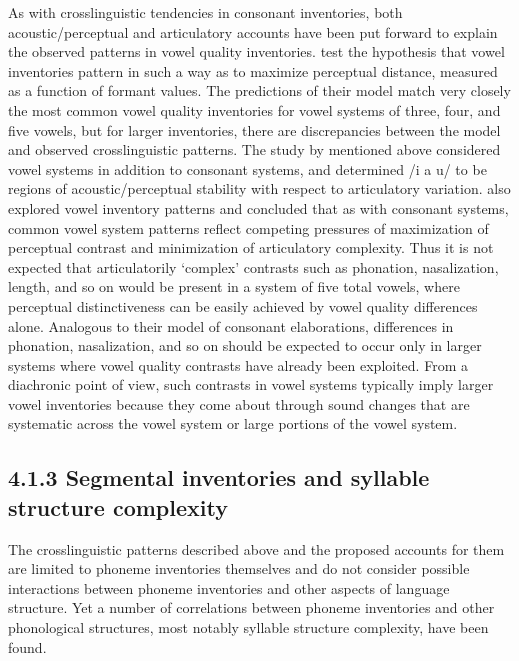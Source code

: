   As with crosslinguistic tendencies in consonant inventories, both acoustic/perceptual and articulatory accounts have been put forward to explain the observed patterns in vowel quality inventories. \citet{LiljencrantsLindblom1972} test the hypothesis that vowel inventories pattern in such a way as to maximize perceptual distance, measured as a function of formant values. The predictions of their model match very closely the most common vowel quality inventories for vowel systems of three, four, and five vowels, but for larger inventories, there are discrepancies between the model and observed crosslinguistic patterns. The study by \citet{Stevens1989} mentioned above considered vowel systems in addition to consonant systems, and determined /i a u/ to be regions of acoustic/perceptual stability with respect to articulatory variation. \citet{LindblomMaddieson1988} also explored vowel inventory patterns and concluded that as with consonant systems, common vowel system patterns reflect competing pressures of maximization of perceptual contrast and minimization of articulatory complexity. Thus it is not expected that articulatorily ‘complex’ contrasts such as phonation, nasalization, length, and so on would be present in a system of five total vowels, where perceptual distinctiveness can be easily achieved by vowel quality differences alone. Analogous to their model of consonant elaborations, differences in phonation, nasalization, and so on should be expected to occur only in larger systems where vowel quality contrasts have already been exploited. From a diachronic point of view, such contrasts in vowel systems typically imply larger vowel inventories because they come about through sound changes that are systematic across the vowel system or large portions of the vowel system.


\subsection{4.1.3 Segmental inventories and syllable structure complexity}

  The crosslinguistic patterns described above and the proposed accounts for them are limited to phoneme inventories themselves and do not consider possible interactions between phoneme inventories and other aspects of language structure. Yet a number of correlations between phoneme inventories and other phonological structures, most notably syllable structure complexity, have been found.



